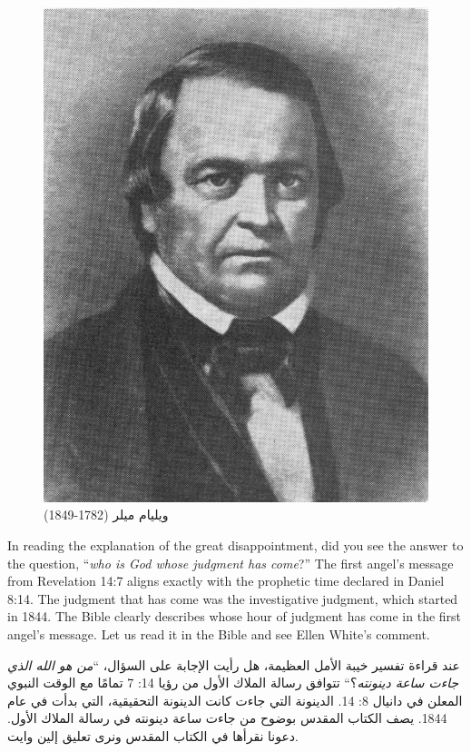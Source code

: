 \begin{figure}[hp]
    \centering
    \includegraphics[width=1\linewidth]{images/william-miller.jpg}
    \caption*{ويليام ميلر (1782-1849)}
    \label{fig:w-miller}
\end{figure}


In reading the explanation of the great disappointment, did you see the answer to the question, “\textit{who is God whose judgment has come}?” The first angel’s message from Revelation 14:7 aligns exactly with the prophetic time declared in Daniel 8:14. The judgment that has come was the investigative judgment, which started in 1844. The Bible clearly describes whose hour of judgment has come in the first angel’s message. Let us read it in the Bible and see Ellen White’s comment.


عند قراءة تفسير خيبة الأمل العظيمة، هل رأيت الإجابة على السؤال، “\textit{من هو الله الذي جاءت ساعة دينونته}؟“ تتوافق رسالة الملاك الأول من رؤيا 14: 7 تمامًا مع الوقت النبوي المعلن في دانيال 8: 14. الدينونة التي جاءت كانت الدينونة التحقيقية، التي بدأت في عام 1844. يصف الكتاب المقدس بوضوح من جاءت ساعة دينونته في رسالة الملاك الأول. دعونا نقرأها في الكتاب المقدس ونرى تعليق إلين وايت.


